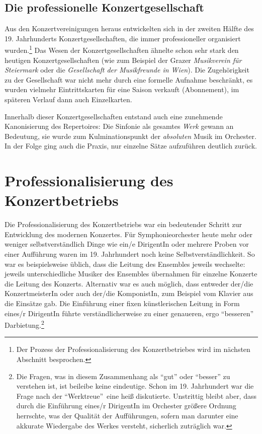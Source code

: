 \documentclass[a4paper, german, oneside]{scrbook}
\begin{document}
\subsection{Die professionelle Konzertgesellschaft}
\label{konzertgesellschaft}
Aus den Konzertvereinigungen heraus entwickelten sich in der zweiten Hälfte des 19. Jahrhunderts Konzertgesellschaften, die immer professioneller organisiert wurden.\footnote{Der Prozess der Professionalisierung des Konzertbetriebes wird im nächsten Abschnitt besprochen.} Das Wesen der Konzertgesellschaften ähnelte schon sehr stark den heutigen Konzertgesellschaften (wie zum Beispiel der Grazer \emph{Musikverein für Steiermark} oder die \emph{Gesellschaft der Musikfreunde in Wien}). Die Zugehörigkeit zu der Gesellschaft war nicht mehr durch eine formelle Aufnahme beschränkt, es wurden vielmehr Eintrittskarten für eine Saison verkauft (Abonnement), im späteren Verlauf dann auch Einzelkarten. \parencite[vgl.][106]{heister_konzert:_1983}

Innerhalb dieser Konzertgesellschaften entstand auch eine zunehmende Kanonisierung des Repertoires: Die Sinfonie als gesamtes \emph{Werk} gewann an Bedeutung, sie wurde zum Kulminationspunkt der \emph{absoluten} Musik im Orchester. In der Folge ging auch die Praxis, nur einzelne Sätze aufzuführen deutlich zurück. \parencite[vgl.][231ff.]{muller_publikum_2014}



\section{Professionalisierung des Konzertbetriebs}
\label{professionalisierung}
Die Professionalisierung des Konzertbetriebs war ein bedeutender Schritt zur Entwicklung des modernen Konzertes. Für Symphonieorchester heute mehr oder weniger selbstverständlich Dinge wie ein/e DirigentIn oder mehrere Proben vor einer Aufführung waren im 19. Jahrhundert noch keine Selbstverständlichkeit. So war es beispielsweise üblich, dass die Leitung des Ensembles jeweils wechselte: jeweils unterschiedliche Musiker des Ensembles übernahmen für einzelne Konzerte die Leitung des Konzerts. \parencite[vgl.][68]{weber_music_2004} Alternativ war es auch möglich, dass entweder der/die KonzertmeisterIn oder auch der/die KomponistIn, zum Beispiel vom Klavier aus die Einsätze gab. Die Einführung einer fixen künstlerischen Leitung in Form eines/r DirigentIn führte verständlicherweise zu einer genaueren, ergo \enquote{besseren} Darbietung.\footnote{Die Fragen, was in diesem Zusammenhang als \enquote{gut} oder \enquote{besser} zu verstehen ist, ist beileibe keine eindeutige. Schon im 19. Jahrhundert war die Frage nach der \enquote{Werktreue} eine heiß diskutierte. Unstrittig bleibt aber, dass durch die Einführung eines/r DirigentIn im Orchester größere Ordnung herrschte, was der Qualität der Aufführungen, sofern man darunter eine akkurate Wiedergabe des Werkes versteht, sicherlich zuträglich war.}
\end{document}
